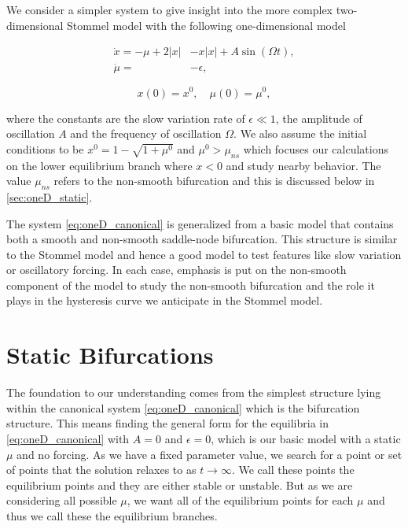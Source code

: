 We consider a simpler system to give insight into the more complex two-dimensional Stommel model with the following one-dimensional model

\begin{equation}\label{eq:oneD_canonical}
\begin{aligned}
\dot{x}=-\mu+2|x|&-x|x|+A\sin(\Omega t),\\
\dot{\mu}=&-\epsilon,
\end{aligned}
\end{equation}

\begin{equation*}
x(0)=x^0,\quad\mu(0)=\mu^0,
\end{equation*}

where the constants are the slow variation rate of $\epsilon \ll 1$, the amplitude of oscillation $A$ and the frequency of oscillation $\Omega$. We also assume the initial conditions to be ${x^0=1-\sqrt{1+\mu^0}}$ and $\mu^0>\mu_{ns}$ which focuses our calculations on the lower equilibrium branch where $x<0$ and study nearby behavior. The value $\mu_{ns}$ refers to the non-smooth bifurcation and this is discussed below in \autoref{sec:oneD_static}.

The system \eqref{eq:oneD_canonical} is generalized from a basic model that contains both a smooth and non-smooth saddle-node bifurcation. This structure is similar to the Stommel model and hence a good model to test features like slow variation or oscillatory forcing. In each case, emphasis is put on the non-smooth component of the model to study the non-smooth bifurcation and the role it plays in the hysteresis curve we anticipate in the Stommel model.

\section{Static Bifurcations}
\label{sec:oneD_static}

The foundation to our understanding comes from the simplest structure lying within the canonical system \eqref{eq:oneD_canonical} which is the bifurcation structure. This means finding the general form for the equilibria in \eqref{eq:oneD_canonical} with $A=0$ and $\epsilon=0$, which is our basic model with a static $\mu$ and no forcing. As we have a fixed parameter value, we search for a point or set of points that the solution relaxes to as $t\to \infty$. We call these points the equilibrium points and they are either stable or unstable. But as we are considering all possible $\mu$, we want all of the equilibrium points for each $\mu$ and thus we call these the equilibrium branches.

